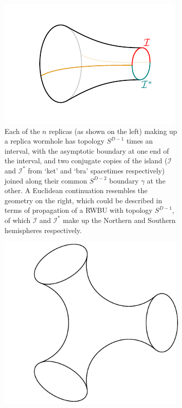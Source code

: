 \documentclass[letterpaper,12pt]{article}
\newcommand*{\island}{\mathcal{I}}
\begin{document}
\begin{figure}[h]
\centering
\begin{subfigure}[t]{.9\textwidth}
	\centering
	\raisebox{55pt}{\scalebox{1.5}{$\longrightarrow$}}\quad
	\includegraphics[width=.35\textwidth]{RWBU2}
	\caption{Each of the $n$ replicas (as shown on the left) making up a replica wormhole has topology $S^{D-1}$ times an interval, with the asymptotic boundary at one end of the interval, and two conjugate copies of the island ($\island$ and $\island^*$ from `ket' and `bra' spacetimes respectively) joined along their common $S^{D-2}$ boundary $\gamma$ at the other. A Euclidean continuation resembles the geometry on the right, which could be described in terms of propagation of a RWBU with topology $S^{D-1}$, of which $\island$ and $\island^*$ make up the Northern and Southern hemispheres respectively.\label{fig:PSBUa}}
\label{fig:PSrho2a}
\end{subfigure}
\begin{subfigure}[t]{.9\textwidth}
	\centering
	\qquad\qquad
	\includegraphics[width=.3\textwidth]{wormhole3}

\end{subfigure}
\end{figure}
\end{document}
